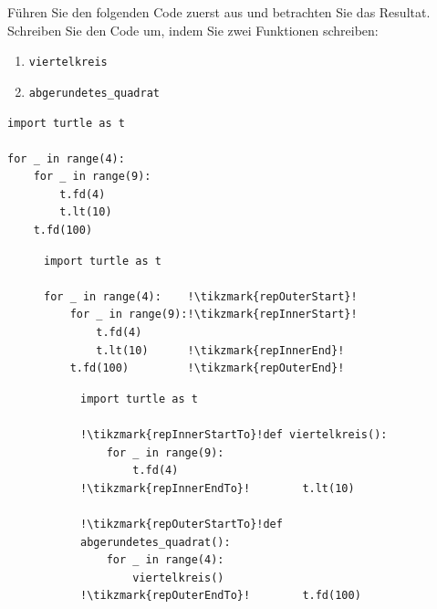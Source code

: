 \begin{myexercise}
	Führen Sie den folgenden Code zuerst aus und betrachten Sie das Resultat. Schreiben Sie den Code um, indem Sie zwei Funktionen schreiben:

	\begin{enumerate}
		\item \lstinline|viertelkreis|
		\item \lstinline|abgerundetes_quadrat|
	\end{enumerate}

	\begin{lstlisting}
import turtle as t

for _ in range(4):
    for _ in range(9):
        t.fd(4)
        t.lt(10)
    t.fd(100)
\end{lstlisting}

	\begin{myanswer}
		\begin{figure}[H]
			\centering
			\begin{minipage}{.4\textwidth}
				\begin{lstlisting}[escapechar=!]
import turtle as t

for _ in range(4):    !\tikzmark{repOuterStart}!
    for _ in range(9):!\tikzmark{repInnerStart}!
        t.fd(4)
        t.lt(10)      !\tikzmark{repInnerEnd}!
    t.fd(100)         !\tikzmark{repOuterEnd}!
\end{lstlisting}
			\end{minipage}\hfill\begin{minipage}{.4\textwidth}
				\begin{figure}[H] %
					\begin{lstlisting}[escapechar=!]
import turtle as t

!\tikzmark{repInnerStartTo}!def viertelkreis():
    for _ in range(9):
        t.fd(4)
!\tikzmark{repInnerEndTo}!        t.lt(10)

!\tikzmark{repOuterStartTo}!def abgerundetes_quadrat():
    for _ in range(4):
        viertelkreis()
!\tikzmark{repOuterEndTo}!        t.fd(100)


\end{lstlisting}
\end{figure}
\end{minipage}
\end{figure}
\end{myanswer}
\end{myexercise}
